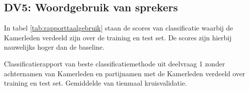 \subsection{DV5: Woordgebruik van sprekers}
In tabel \ref{tab:rapporttaalgebruik} staan de scores van classificatie waarbij de Kamerleden verdeeld zijn over de training en test set. De scores zijn hierbij nauwelijks hoger dan de baseline.
\begin{table}[H]
\caption{Classificatierapport van beste classificatiemethode uit deelvraag 1 zonder achternamen van Kamerleden en partijnamen met de Kamerleden verdeeld over training en test set. Gemiddelde van tienmaal kruisvalidatie.}
\label{tab:rapporttaalgebruik}
\centering

\end{table}

